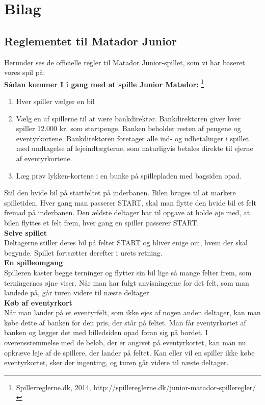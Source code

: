 \chapter{Bilag}

\section{Reglementet til Matador Junior}
Herunder ses de officielle regler til Matador Junior-spillet, som vi har baseret vores spil på:\\
\textbf{Sådan kommer I i gang med at spille Junior Matador:} \footnote{Spillerreglerne.dk, 2014, http://spillereglerne.dk/junior-matador-spilleregler/}
\begin{enumerate}
    \item Hver spiller vælger en bil
    \item Vælg en af spillerne til at være bankdirektør. 
    Bankdirektøren giver hver spiller 12.000 kr. som startpenge. 
    Banken beholder resten af pengene og eventyrkortene. 
    Bankdirektøren foretager alle ind- og udbetalinger i spillet med undtagelse af lejeindtægterne, som naturligvis betales direkte til ejerne af eventyrkortene.
    \item Læg prøv lykken-kortene i en bunke på spillepladen med bagsiden opad.\\
\end{enumerate}
Stil den hvide bil på startfeltet på inderbanen. 
Bilen bruges til at markere spilletiden.
Hver gang man passerer START, skal man flytte den hvide bil et felt fremad på inderbanen. 
Den ældste deltager har til opgave at holde øje med, at bilen flyttes et felt frem, hver gang en spiller passerer START.\\

\textbf{Selve spillet}
\\Deltagerne stiller deres bil på feltet START og bliver enige om, hvem der skal begynde. 
Spillet fortsætter derefter i urets retning.\\

\textbf{En spilleomgang}
\\Spilleren kaster begge terninger og flytter sin bil lige så mange felter frem, som terningernes øjne viser. 
Når man har fulgt anvisningerne for det felt, som man landede på, går turen videre til næste deltager.\\

\textbf{Køb af eventyrkort}
\\Når man lander på et eventyrfelt, som ikke ejes af nogen anden deltager, kan man købe dette af banken for den pris, der står på feltet. 
Man får eventyrkortet af banken og lægger det med billedsiden opad foran sig på bordet. 
I overensstemmelse med de beløb, der er angivet på eventyrkortet, kan man nu opkræve leje af de spillere, der lander på feltet. 
Kan eller vil en spiller ikke købe eventyrkortet, sker der ingenting, og turen går videre til næste deltager.\\

